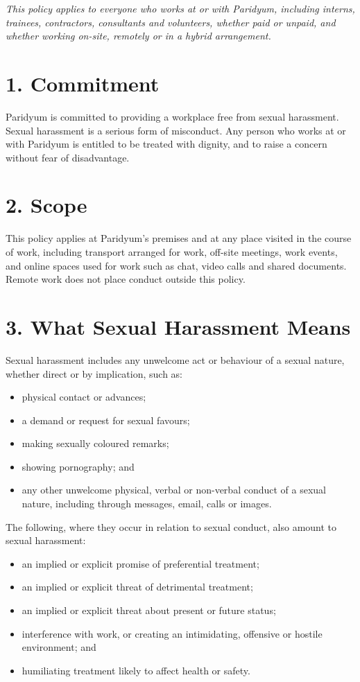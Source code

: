 \documentclass{paridyum}
\begin{document}
\paridyumletterhead
\paridyumdateref{\dkDocDate}{\dkDocRef}

\textit{This policy applies to everyone who works at or with Paridyum, including
interns, trainees, contractors, consultants and volunteers, whether paid or unpaid,
and whether working on-site, remotely or in a hybrid arrangement.}

\section*{1. Commitment}
Paridyum is committed to providing a workplace free from sexual harassment. Sexual
harassment is a serious form of misconduct. Any person who works at or with Paridyum
is entitled to be treated with dignity, and to raise a concern without fear of
disadvantage.

\section*{2. Scope}
This policy applies at Paridyum's premises and at any place visited in the course of
work, including transport arranged for work, off-site meetings, work events, and
online spaces used for work such as chat, video calls and shared documents. Remote
work does not place conduct outside this policy.

\section*{3. What Sexual Harassment Means}
Sexual harassment includes any unwelcome act or behaviour of a sexual nature, whether
direct or by implication, such as:
\begin{itemize}[leftmargin=*, noitemsep]
    \item physical contact or advances;
    \item a demand or request for sexual favours;
    \item making sexually coloured remarks;
    \item showing pornography; and
    \item any other unwelcome physical, verbal or non-verbal conduct of a sexual
          nature, including through messages, email, calls or images.
\end{itemize}

The following, where they occur in relation to sexual conduct, also amount to sexual
harassment:
\begin{itemize}[leftmargin=*, noitemsep]
    \item an implied or explicit promise of preferential treatment;
    \item an implied or explicit threat of detrimental treatment;
    \item an implied or explicit threat about present or future status;
    \item interference with work, or creating an intimidating, offensive or hostile
          environment; and
    \item humiliating treatment likely to affect health or safety.
\end{itemize}
\end{document}
